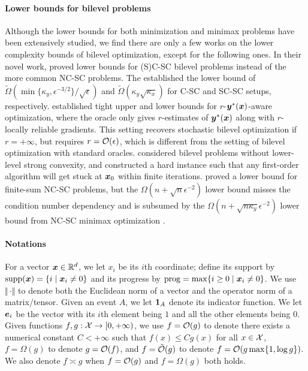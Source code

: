 \documentclass{article}
\begin{document}
\paragraph{Lower bounds for bilevel problems} Although the lower bounds for both minimization and minimax problems have been extensively studied, we find there are only a few works on the lower complexity bounds of bilevel optimization, except for the following ones. In their novel work,
\citet{ji2023lower} proved lower bounds for (S)C-SC bilevel problems instead of the more common NC-SC problems. 
The established the lower bound of $\tilde \Omega(\min \{ \kappa_y, \epsilon^{-3/2} \} / \sqrt{\epsilon}  )$ and 
$\tilde \Omega (\kappa_y \sqrt{\kappa_x})$
for C-SC and SC-SC setups, respectively.
\citet{kwon2024complexity} established tight upper and lower bounds for $r$-${\bm{y}}^*({\bm{x}})$-aware optimization, 
where the oracle only gives  $r$-estimates of ${\bm{y}}^*({\bm{x}})$ along with $r$-locally reliable gradients. This setting recovers stochastic bilevel optimization if $r = +\infty$, but requires $r = 
{\mathcal{O}}(\epsilon)$, which is different from the setting of bilevel optimization with standard oracles.
\citet{chen2024finding} considered bilevel problems without lower-level strong convexity, and constructed a hard instance such that any first-order algorithm will get stuck at ${\bm{x}}_0$ within finite iterations. \citet{dagreou2024lower} proved a lower bound for finite-sum NC-SC problems, but the $\Omega(n+ \sqrt{n} \epsilon^{-2})$ lower bound misses the condition number dependency and is subsumed by the $\Omega(n + \sqrt{n \kappa_y} \epsilon^{-2})$ lower bound from NC-SC minimax optimization \citep{zhang2021complexity}.

 \paragraph{Notations} For a vector ${\bm{x}} \in {\mathbb{R}}^d$, 
 we let $x_i $ be its $i$th coordinate; define its support by ${\rm supp}({\bm{x}}) = \{ i \mid {\bm{x}}_i \ne 0 \}$ and its progress by ${\rm prog} = \max\{ i \ge 0 \mid {\bm{x}}_i \ne 0 \}$. We use $\Vert \,\cdot \Vert$ to denote both the Euclidean norm of a vector and the operator norm of a matrix/tensor. 
 Given an event $A$, we let ${\bm{1}}_A$ denote its indicator function. We let ${\bm{e}}_i$ be the vector with its $i$th element being $1$ and all the other elements being $0$.
 Given functions $f,g : {\mathcal{X}} \rightarrow [0,+\infty)$, we use $f = {\mathcal{O}}(g)$ to denote there exists a numerical constant $C< +\infty$
such that $f(x) \le C g(x)$ for all $x \in {\mathcal{X}}$,  $f = \Omega(g)$ to denote $g = {\mathcal{O}}(f)$,  and $f = \tilde {{\mathcal{O}}}(g)$ to denote $f = {\mathcal{O}}(g \max\{1, \log g \})$. We also denote $f \asymp g$ when $f = {\mathcal{O}}(g)$ and $f = \Omega(g)$ both holds.
\end{document}
